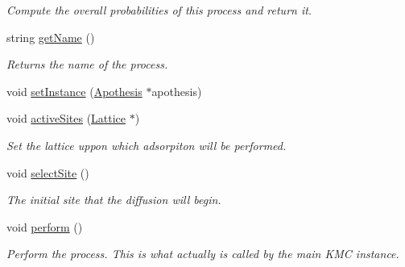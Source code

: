 \begin{DoxyCompactItemize}
\begin{DoxyCompactList}\small\item\em Compute the overall probabilities of this process and return it. \end{DoxyCompactList}\item 
\mbox{\label{classMicroProcesses_1_1Diffusion_ad6cab95e42f11fed711a7b7b324291c8}} 
string \mbox{\hyperlink{classMicroProcesses_1_1Diffusion_ad6cab95e42f11fed711a7b7b324291c8}{get\+Name}} ()
\begin{DoxyCompactList}\small\item\em Returns the name of the process. \end{DoxyCompactList}\item 
void \mbox{\hyperlink{classMicroProcesses_1_1Diffusion_a17993edabb08ca2fb96d22ef3cd838ca}{set\+Instance}} (\mbox{\hyperlink{classApothesis}{Apothesis}} $\ast$apothesis)
\item 
\mbox{\label{classMicroProcesses_1_1Diffusion_ad82f57afa447a4d96b596d242ffb67e2}} 
void \mbox{\hyperlink{classMicroProcesses_1_1Diffusion_ad82f57afa447a4d96b596d242ffb67e2}{active\+Sites}} (\mbox{\hyperlink{classLattice}{Lattice}} $\ast$)
\begin{DoxyCompactList}\small\item\em Set the lattice uppon which adsorpiton will be performed. \end{DoxyCompactList}\item 
\mbox{\label{classMicroProcesses_1_1Diffusion_af699c30b1c182cce03e9a9826b0c5b51}} 
void \mbox{\hyperlink{classMicroProcesses_1_1Diffusion_af699c30b1c182cce03e9a9826b0c5b51}{select\+Site}} ()
\begin{DoxyCompactList}\small\item\em The initial site that the diffusion will begin. \end{DoxyCompactList}\item 
\mbox{\label{classMicroProcesses_1_1Diffusion_afff30436b63d3842c87895358ddbd575}} 
void \mbox{\hyperlink{classMicroProcesses_1_1Diffusion_afff30436b63d3842c87895358ddbd575}{perform}} ()
\begin{DoxyCompactList}\small\item\em Perform the process. This is what actually is called by the main K\+MC instance. \end{DoxyCompactList}\item 

\end{DoxyCompactItemize}
